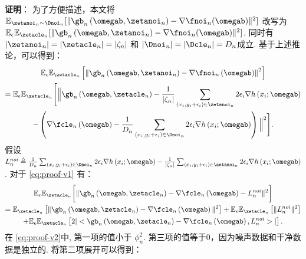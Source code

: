 \noindent \textbf{证明}：
为了方便描述，本文将 $\mathbb{E}_{\zetanoi_n\sim \Dnoi_n}[\Vert \gb_n\left(\omegab,\zetanoi_n\right) - \nabla \fnoi_n(\omegab) \Vert^2 ]$ 改写为 $\mathbb{E}_\epsilon\mathbb{E}_{\zetacle_n}[\Vert \gb_n\left(\omegab,\zetanoi_n\right) - \nabla \fnoi_n(\omegab) \Vert^2 ]$, 
同时有 $|\zetanoi_n|=|\zetacle_n|=|\zeta_n|$ 和 $|\Dnoi_n|=|\Dcle_n|=D_n$成立. 基于上述推论，可以得到： 
\begin{multline}\label{eq:proof-v1}
\mathbb{E}_\epsilon\mathbb{E}_{\zetacle_n}\left[\left\Vert \gb_n\left(\omegab,\zetanoi_n\right) - \nabla \fnoi_n\left(\omegab\right) \right\Vert^2 \right]
\\=\mathbb{E}_\epsilon\mathbb{E}_{\zetacle_n}\Biggl[\Big\Vert \gb_n\left(\omegab,\zetacle_n\right) -\frac{1}{|\zeta_n|}\sum_{\left(x_i,y_i+\epsilon_i\right)\in \zetanoi_n}2\epsilon_i\nabla h\left(x_i;\omegab\right)
\\ -\left(\nabla \fcle_n\left(\omegab\right)-\frac{1}{D_n}\sum_{\left(x_i,y_i+\epsilon_i\right)\in \Dnoi_n}2\epsilon_i\nabla h\left(x_i;\omegab\right)\right)\Big\Vert^2\Biggl].
\end{multline}
假设 $L_n^{noi}\triangleq\frac{1}{D_n}\sum_{\left(x_i,y_i+\epsilon_i\right)\in \Dnoi_n}2\epsilon_i\nabla h\left(x_i;\omegab\right) 
-\frac{1}{|\zeta_n|}\sum_{\left(x_i,y_i+\epsilon_i\right)\in \zetanoi_n}2\epsilon_i\nabla h\left(x_i;\omegab\right)$. 对于 \eqref{eq:proof-v1} 有：
\begin{multline}\label{eq:proof-v2}
\mathbb{E}_\epsilon\mathbb{E}_{\zetacle_n}\biggl[\Vert \gb_n\left(\omegab,\zetacle_n\right)-\nabla \fcle_n\left(\omegab\right)-L_n^{noi}\Vert^2\biggl]\\=\mathbb{E}_{\zetacle_n}\left[\Vert\gb_n\left(\omegab,\zetacle_n\right)-\nabla \fcle_n\left(\omegab\right)\Vert^2\right]
+\mathbb{E}_\epsilon\mathbb{E}_{\zetacle_n}\left[\Vert L_n^{noi}\Vert^2\right] \\
+\mathbb{E}_\epsilon\mathbb{E}_{\zetacle_n}\left[2|<\gb_n\left(\omegab,\zetacle_n\right)-\nabla \fcle_n\left(\omegab\right),L_n^{noi}>|\right].
\end{multline}
在 \eqref{eq:proof-v2}中, 第一项的值小于 $\phi^2_n$. 第三项的值等于0，因为噪声数据和干净数据是独立的. 将第二项展开可以得到：
